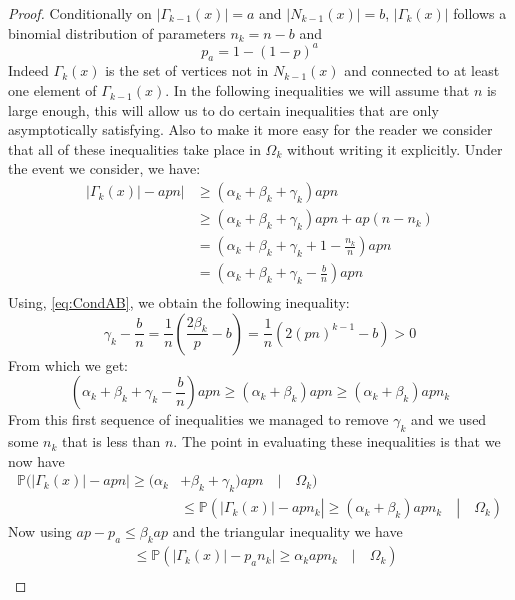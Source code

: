 \begin{proof}
	Conditionally on $|\Gamma_{k-1}(x)| = a$ and $|N_{k-1}(x)| = b$, $|\Gamma_k(x)|$ follows a binomial distribution of parameters $n_k = n-b$ and
	\begin{equation}
		p_a = 1 - (1-p)^a
	\end{equation}
	Indeed $\Gamma_k(x)$ is the set of vertices not in $N_{k-1}(x)$ and connected to at least one element of $\Gamma_{k-1}(x)$.
	\newline
	In the following inequalities we will assume that $n$ is large enough, this will allow us to do certain inequalities that are only asymptotically satisfying. Also to make it more easy for the reader we consider that all of these inequalities take place in $\Omega_k$ without writing it explicitly.
	Under the event we consider, we have:
	\begin{align}
		|\Gamma_k(x)| - apn| &\geq (\alpha_k + \beta_k + \gamma_k)apn \\
		 &\geq (\alpha_k + \beta_k + \gamma_k)apn + ap(n -n_k) \\
		 &= (\alpha_k + \beta_k + \gamma_k + 1 - \frac{n_k}{n})apn \\ 
		 &= (\alpha_k + \beta_k + \gamma_k - \frac{b}{n})apn \\  
	\end{align}
	Using, \eqref{eq:CondAB}, we obtain the following inequality:
	\begin{equation}
		\gamma_k - \frac{b}{n} = \frac{1}{n}(\frac{2\beta_k}{p} - b) = \frac{1}{n}(2(pn)^{k-1} -b) > 0
	\end{equation}
	From which we get:
	\begin{equation}
		 (\alpha_k + \beta_k + \gamma_k - \frac{b}{n})apn \geq (\alpha_k + \beta_k)apn \geq (\alpha_k + \beta_k)apn_k  
	\end{equation}
	From this first sequence of inequalities we managed to remove $\gamma_k$ and we used some $n_k$ that is less than $n$.
	The point in evaluating these inequalities is that we now have
	\begin{align}
		\mathbb{P}(|\Gamma_k(x)| - apn| \geq (\alpha_k &+ \beta_k + \gamma_k)apn \quad|\quad \Omega_k) \\&\leq \mathbb{P}(|\Gamma_k(x)| - apn_k| \geq (\alpha_k + \beta_k )apn_k \quad|\quad \Omega_k)
	\end{align}
	Now using $ap -p_a \leq \beta_k ap$ and the triangular inequality we have
	\begin{align}
		&\leq \mathbb{P}(|\Gamma_k(x)| - p_an_k| \geq \alpha_k apn_k \quad|\quad \Omega_k)\\

\end{align}
\end{proof}
